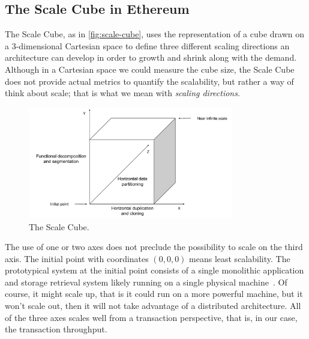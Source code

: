 \subsection{The Scale Cube in Ethereum}

The Scale Cube, as in \autoref{fig:scale-cube}, uses the representation of a
cube drawn on a 3-dimensional Cartesian space to define three different scaling
directions an architecture can develop in order to growth and shrink along with
the demand. Although in a Cartesian space we could measure the cube size, the
Scale Cube does not provide actual metrics to quantify the scalability, but
rather a way of think about scale; that is what we mean with \emph{scaling
directions}.

\begin{figure}
	\begin{center}
		\includegraphics[width=0.8\textwidth]{./res/img/scale-cube.pdf}
	\end{center}
	\caption{The Scale Cube.}
	\label{fig:scale-cube}
\end{figure}

The use of one or two axes does not preclude the possibility to scale on the
third axis. The initial point with coordinates $(0,0,0)$ means least
scalability. The prototypical system at the initial point consists of a single
monolithic application and storage retrieval system likely running on a single
physical machine~\cite{bib:art-of-scalability}. Of course, it might scale up,
that is it could run on a more powerful machine, but it won't scale out, then it
will not take advantage of a distributed architecture. All of the three axes
scales well from a transaction perspective, that is, in our case, the
transaction throughput. %